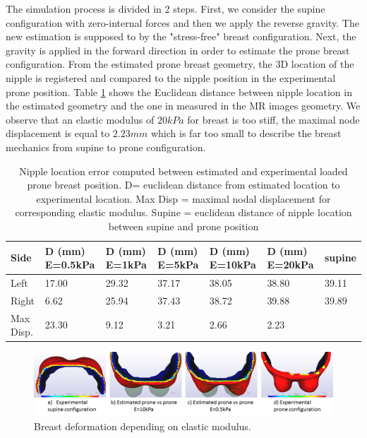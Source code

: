 The simulation process is divided in 2 steps. First, we consider the supine configuration with zero-internal forces and then we apply the reverse gravity. The new estimation is supposed to by the "stress-free" breast configuration.  Next, the gravity is applied in the forward direction in order to estimate the prone breast configuration. From the estimated prone breast geometry, the 3D location of the nipple is registered and compared to the nipple position in the experimental prone position. Table \ref{nippleError} shows the Euclidean distance between nipple location in the estimated geometry and the one in measured in the MR images geometry. We observe that an elastic modulus of $20 kPa$ for breast is too stiff, the maximal node displacement is equal to $2.23 mm$ which is far too small to describe the breast mechanics from supine to prone configuration.  
\begin{table}[h]
\begin{center}
\begin{small}
\begin{tabularx}{15cm}{|p{2cm}|X|X|X|X|X|X|}
\hline
Side & D (mm) E=0.5kPa &D (mm) E=1kPa &D (mm) E=5kPa&D (mm) E=10kPa&D (mm) E=20kPa & supine\\
\hline
\rowcolor{mygray}Left &17.00&29.32&37.17&38.05&38.80& 39.11\\
Right &6.62&25.94&37.43&38.72&39.88&39.89\\
\rowcolor{mygray}Max Disp. &23.30&9.12&3.21&2.66&2.23&\\
\hline


\end{tabularx}
\end{small}
\caption{Nipple location error computed between estimated and experimental loaded prone breast position. D= euclidean distance from estimated location to experimental location. Max Disp = maximal nodal displacement for corresponding elastic modulus. Supine = euclidean distance of nipple location between supine and prone position}
\label{nippleError}
\end{center}
\end{table}

\begin{center}			  
\begin{figure}[H]
\centerline{\includegraphics[scale=0.7]{figures/elasticModulus.png} }
\caption{Breast deformation depending on elastic modulus.}
\label{elasticModulus}
\end{figure}
\end{center}


